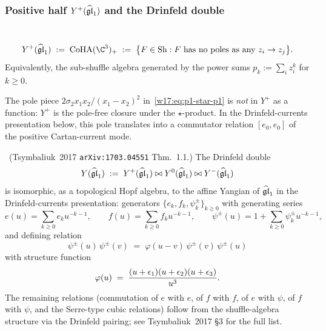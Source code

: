 \subsubsection{Positive half $Y^+(\widehat{\mathfrak{gl}}_1)$ and the Drinfeld double}
\label{w17:subsubsec:positive-half}

\begin{definition}
\label{w17:def:positive-half}
\ClaimStatusDefinition\
\[
 Y^+(\gghone) \;:=\; \CoHA(\C^3)_+ \;:=\;
 \bigl\{F \in \Sh : F \text{ has no poles as any } z_i \to z_j\bigr\}.
\]
Equivalently, the sub-shuffle algebra generated by the power sums
$p_k := \sum_i z_i^k$ for $k \geq 0$.
\end{definition}

The pole piece $2 \sigma_2 x_1 x_2/(x_1 - x_2)^2$ in~\eqref{w17:eq:p1-star-p1}
is \emph{not} in $Y^+$ as a function: $Y^+$ is the pole-free closure under the
$\star$-product. In the Drinfeld-currents presentation below, this pole
translates into a commutator relation $[e_0, e_0]$ of the positive Cartan-current
mode.

\begin{theorem}
\label{w17:thm:tsymbaliuk-double}
\ClaimStatusProvedElsewhere\ (Tsymbaliuk~2017 \texttt{arXiv:1703.04551} Thm.~1.1.)
The Drinfeld double
\[
 Y(\widehat{\mathfrak{gl}}_1) \;:=\; Y^+(\widehat{\mathfrak{gl}}_1) \bowtie Y^0(\widehat{\mathfrak{gl}}_1) \bowtie Y^-(\widehat{\mathfrak{gl}}_1)
\]
is isomorphic, as a topological Hopf algebra, to the affine Yangian of $\widehat{\mathfrak{gl}}_1$
in the Drinfeld-currents presentation: generators
$\{e_k, f_k, \psi_k^\pm\}_{k \geq 0}$ with generating series
\begin{equation}
\label{w17:eq:drinfeld-currents}
 e(u) = \sum_{k \geq 0} e_k u^{-k-1}, \qquad f(u) = \sum_{k \geq 0} f_k u^{-k-1},
 \qquad \psi^\pm(u) = 1 + \sum_{k \geq 0} \psi_k^\pm u^{-k-1},
\end{equation}
and defining relation
\begin{equation}
\label{w17:eq:psi-psi-relation}
 \boxed{\;\psi^\pm(u) \, \psi^\pm(v) \;=\; \varphi(u - v)\,
 \psi^\pm(v) \, \psi^\pm(u)\;}
\end{equation}
with structure function
\begin{equation}
\label{w17:eq:structure-function}
 \varphi(u) \;=\; \frac{(u + \epsilon_1)(u + \epsilon_2)(u + \epsilon_3)}{u^3}.
\end{equation}
The remaining relations (commutation of $e$ with $e$, of $f$ with $f$, of $e$ with
$\psi$, of $f$ with $\psi$, and the Serre-type cubic relations) follow from the
shuffle-algebra structure via the Drinfeld pairing; see Tsymbaliuk~2017 \S3 for
the full list.
\end{theorem}

